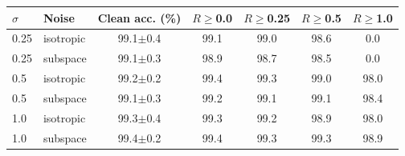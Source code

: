 \begin{tabular}{llccccc}
\toprule
$\sigma$ & Noise & Clean acc. (\%) & $R\geq$0.0 & $R\geq$0.25 & $R\geq$0.5 & $R\geq$1.0 \\
\midrule
0.25 & isotropic & 99.1$\pm$0.4 & 99.1 & 99.0 & 98.6 & 0.0 \\
0.25 & subspace & 99.1$\pm$0.3 & 98.9 & 98.7 & 98.5 & 0.0 \\
0.5 & isotropic & 99.2$\pm$0.2 & 99.4 & 99.3 & 99.0 & 98.0 \\
0.5 & subspace & 99.1$\pm$0.3 & 99.2 & 99.1 & 99.1 & 98.4 \\
1.0 & isotropic & 99.3$\pm$0.4 & 99.3 & 99.2 & 98.9 & 98.0 \\
1.0 & subspace & 99.4$\pm$0.2 & 99.4 & 99.3 & 99.3 & 98.9 \\
\bottomrule
\end{tabular}